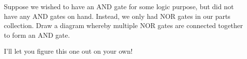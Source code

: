 

Suppose we wished to have an AND gate for some logic purpose, but did not have any AND gates on hand.  Instead, we only had NOR gates in our parts collection.  Draw a diagram whereby multiple NOR gates are connected together to form an AND gate.

\vskip 50pt







I'll let you figure this one out on your own!











